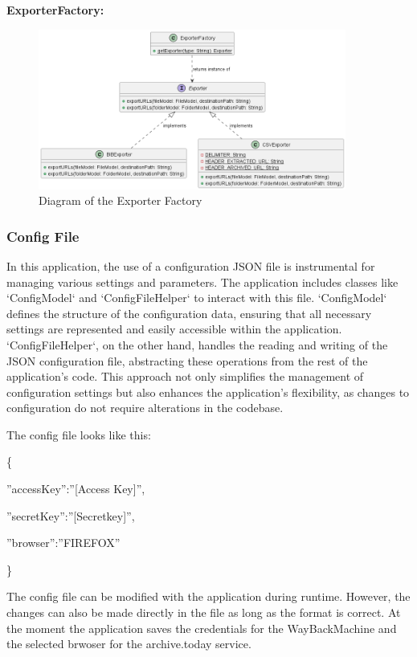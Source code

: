 \textbf{ExporterFactory:} \\

\begin{figure}[h!]
    \center
    \includegraphics[width=0.9\textwidth]{pictures/ExporterFactory-0.png}
    \caption{Diagram of the Exporter Factory}
    \label{fig:ExporterFactory_Diagram}
\end{figure}

\clearpage
\subsubsection{Config File}
In this application, the use of a configuration JSON file is instrumental for managing various settings and parameters. The application includes classes like `ConfigModel` and `ConfigFileHelper` to interact with this file. `ConfigModel` defines the structure of the configuration data, ensuring that all necessary settings are represented and easily accessible within the application. `ConfigFileHelper`, on the other hand, handles the reading and writing of the JSON configuration file, abstracting these operations from the rest of the application's code. This approach not only simplifies the management of configuration settings but also enhances the application's flexibility, as changes to configuration do not require alterations in the codebase.

The config file looks like this:

\{

\quad''accessKey'':''[Access Key]'',

\quad''secretKey'':''[Secretkey]'',

\quad''browser'':''FIREFOX''

\}


The config file can be modified with the application during runtime. However, the changes can also be made directly in the file as long as the format is correct.
At the moment the application saves the credentials for the WayBackMachine and the selected brwoser for the archive.today service.
\clearpage

